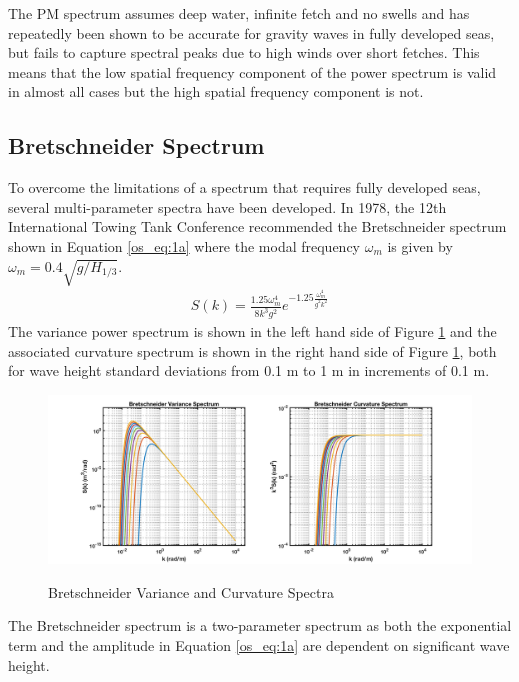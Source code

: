 The PM spectrum assumes deep water, infinite fetch and no swells and has repeatedly been shown to be accurate for gravity waves in fully developed seas, but fails to capture spectral peaks due to high winds over short fetches. This means that the low spatial frequency component of the power spectrum is valid in almost all cases but the high spatial frequency component is not.

\subsection{Bretschneider Spectrum}
To overcome the limitations of a spectrum that requires fully developed seas, several multi-parameter spectra have been developed. In 1978, the 12th International Towing Tank Conference recommended the Bretschneider spectrum \cite{michel_sea_spectra} shown in Equation \ref{os_eq:1a} where the modal frequency $\omega_m$ is given by $\omega_m = 0.4\sqrt{g/H_{1/3}}$.
\begin{equation}
  \begin{gathered}
  \label{os_eq:1a}
  S(k) = \frac{1.25 \omega_m^4}{8k^3g^2}e^{-1.25\frac{\omega_m^4}{g^2k^2}} 
  \end{gathered}
\end{equation}
\renewcommand{\baselinestretch}{2} \small\normalsize
The variance power spectrum is shown in the left hand side of Figure \ref{os_fig:1a} and the associated curvature spectrum is shown in the right hand side of Figure \ref{os_fig:1a}, both for wave height standard deviations from 0.1 m to 1 m in increments of 0.1 m.

 \begin{figure}[H]
  \begin{center}
\includegraphics[width=6in]{../media/Ocean_Surface/bs_variance_curvature_spectrum.png}
  \end{center}
  \renewcommand{\baselinestretch}{1} \small\normalsize
  \begin{quote}
    \caption[Bretschneider Variance and Curvature Spectra]{Bretschneider Variance and Curvature Spectra\label{os_fig:1a}}
  \end{quote}
\end{figure}
 \renewcommand{\baselinestretch}{2} \small\normalsize
The Bretschneider spectrum is a two-parameter spectrum as both the exponential term and the amplitude in Equation \ref{os_eq:1a} are dependent on significant wave height.

